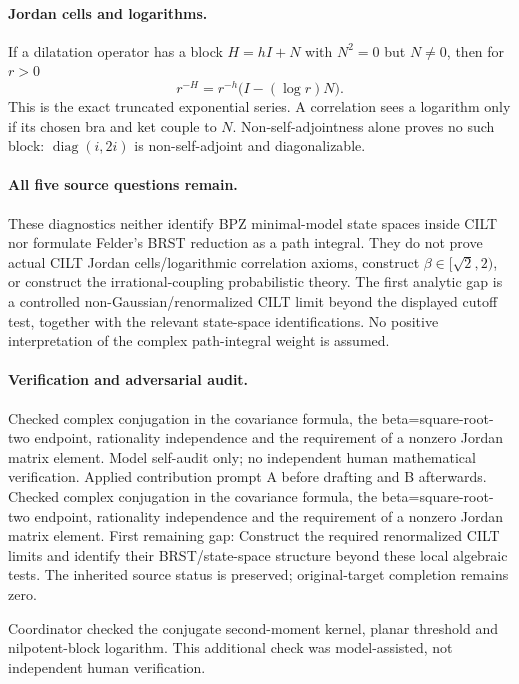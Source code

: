 \documentclass[11pt]{article}
\begin{document}
\paragraph{Jordan cells and logarithms.} If a dilatation operator has a block \(H=hI+N\) with \(N^2=0\) but \(N\ne0\), then for \(r>0\)
\[
 r^{-H}=r^{-h}\bigl(I-(\log r)N\bigr).
\]
This is the exact truncated exponential series. A correlation sees a logarithm only if its chosen bra and ket couple to \(N\). Non-self-adjointness alone proves no such block: \(\operatorname{diag}(i,2i)\) is non-self-adjoint and diagonalizable.
\paragraph{All five source questions remain.} These diagnostics neither identify BPZ minimal-model state spaces inside CILT nor formulate Felder's BRST reduction as a path integral. They do not prove actual CILT Jordan cells/logarithmic correlation axioms, construct \(\beta\in[\sqrt2,2)\), or construct the irrational-coupling probabilistic theory. The first analytic gap is a controlled non-Gaussian/renormalized CILT limit beyond the displayed cutoff test, together with the relevant state-space identifications. No positive interpretation of the complex path-integral weight is assumed.

\paragraph{Verification and adversarial audit.}
Checked complex conjugation in the covariance formula, the beta=square-root-two endpoint, rationality independence and the requirement of a nonzero Jordan matrix element. Model self-audit only; no independent human mathematical verification. Applied contribution prompt A before drafting and B afterwards. Checked complex conjugation in the covariance formula, the beta=square-root-two endpoint, rationality independence and the requirement of a nonzero Jordan matrix element. First remaining gap: Construct the required renormalized CILT limits and identify their BRST/state-space structure beyond these local algebraic tests. The inherited source status is preserved; original-target completion remains zero.

Coordinator checked the conjugate second-moment kernel, planar threshold and nilpotent-block logarithm. This additional check was model-assisted, not independent human verification.
\end{document}
